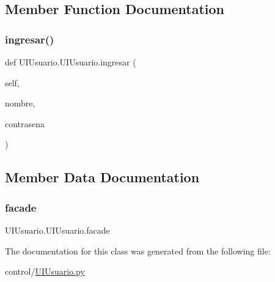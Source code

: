 \subsection{Member Function Documentation}
\mbox{\label{class_u_i_usuario_1_1_u_i_usuario_ad83e1ef18f57b281a7708fd8ef0d3da4}} 
\subsubsection{\texorpdfstring{ingresar()}{ingresar()}}
{\footnotesize\ttfamily def U\+I\+Usuario.\+U\+I\+Usuario.\+ingresar (\begin{DoxyParamCaption}\item[{}]{self,  }\item[{}]{nombre,  }\item[{}]{contrasena }\end{DoxyParamCaption})}



\subsection{Member Data Documentation}
\mbox{\label{class_u_i_usuario_1_1_u_i_usuario_a03b33bc6d21217abcdbaef28c27c24e9}} 
\subsubsection{\texorpdfstring{facade}{facade}}
{\footnotesize\ttfamily U\+I\+Usuario.\+U\+I\+Usuario.\+facade}



The documentation for this class was generated from the following file\+:\begin{DoxyCompactItemize}
\item 
control/\mbox{\hyperlink{_u_i_usuario_8py}{U\+I\+Usuario.\+py}}\end{DoxyCompactItemize}
